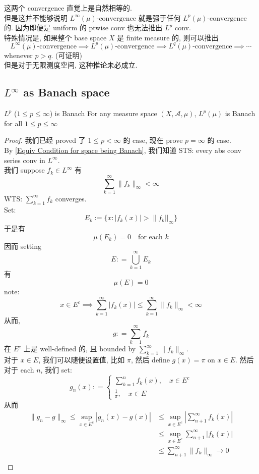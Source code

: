 \documentclass[lang=cn,11pt]{elegantbook}
\begin{document}
\begin{remark}
这两个 convergence 直觉上是自然相等的.\\
但是这并不能够说明 $   L^\infty(\mu)\text{-convergence}$ 就是强于任何 $L^p(\mu)\text{-convergence} $ 的. 因为即便是 uniform 的 ptwise conv 也无法推出 $L^p$ conv. \\
特殊情况是, 如果整个 base space $X$ 是 finite measure 的, 则可以推出\[
     L^\infty(\mu)\text{-convergence} \implies  L^p(\mu)\text{-convergence} \implies  L^q(\mu)\text{-convergence} \implies\cdots
    \]
    whenever $p > q$. (可证明)\\
    但是对于无限测度空间, 这种推论未必成立.
\end{remark}



\subsection{$L^\infty$ as Banach space}
\begin{theorem}{$L^p$ ($1\leq p \leq \infty$) is Banach}
For any measure space $(X,\mathcal{A},\mu)$, $L^p(\mu)$ is Banach for all $1\leq p \leq \infty$
\end{theorem}
\begin{proof}
我们已经 proved 了 $1\leq p < \infty$ 的 case, 现在 prove $p = \infty$ 的 case.\\
By \ref{Equiv Condition for space being Banach}, 我们知道 STS: every abs conv series conv in $L^\infty$.\\
我们 suppose $f_k \in L^\infty$ 有 \[
\sum_{k=1}^\infty \| f_k \|_\infty < \infty
\]
WTS: \(\sum_{k=1}^\infty f_k \) converges.\\
Set: \[
E_k := \{x: |f_k(x)| > \|f_k||_\infty\}
\]
于是有 \[
\mu(E_k) = 0 \quad \text{for each }k
\]
因而 setting \[
E : = \bigcup_{k=1}^\infty E_k
\]有 \[
\mu(E) = 0
\]
note: \[
x \in E^c \implies \sum_{k=1}^\infty |f_k(x)| \leq \sum_{k=1}^\infty \| f_k \|_\infty < \infty
\]
从而, \[
g: = \sum_{k=1}^\infty  f_k
\]在 $E^c$ 上是 well-defined 的, 且 bounded by $\sum_{k=1}^\infty \| f_k \|_\infty $.\\
对于 $x\in E$, 我们可以随便设置值, 比如 $\pi$, 然后 define $g(x)= \pi$ on $x\in E$. 然后对于 each $n$, 我们 set: \[
g_n(x) : = \begin{cases}
    \sum_{k=1}^n f_k(x),\quad x \in E^c \\
    \frac{1}{\pi},\quad x\in E
\end{cases}
\] 从而
\begin{align*}
    \|g_n - g \|_\infty \leq \sup_{x\in E^c} |g_n (x) -g (x)|  
   &\leq \sup_{x\in E^c} |\sum_{n+1}^\infty f_k(x)| \\
   &\leq \sup_{x\in E^c} \sum_{n+1}^\infty |f_k(x)| \\
    &\leq \sum_{n+1}^\infty  \|f_k\|_\infty \to 0\\
\end{align*}
\end{proof}
\end{document}
